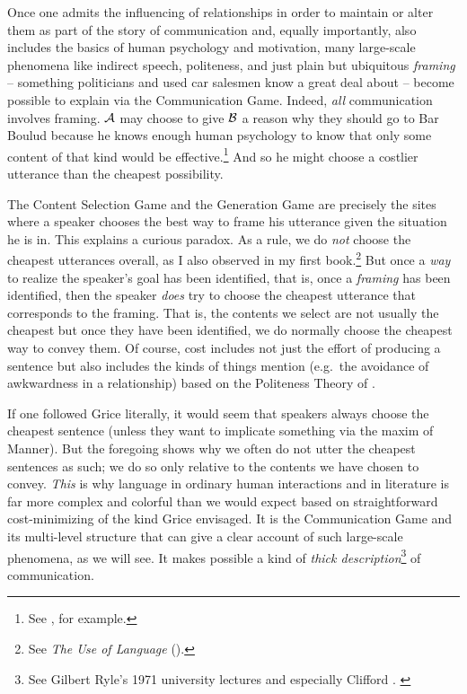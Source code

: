 Once one admits the influencing of relationships in order to maintain or alter them as part of the story of communication and, equally importantly, also includes the basics of human psychology and motivation, many large-scale phenomena like indirect speech, politeness, and just plain but ubiquitous \emph{framing} -- something politicians and used car salesmen know a great deal about -- become possible to explain via the Communication Game. Indeed, \emph{all} communication involves framing. $\cal A$ may choose to give $\cal B$ a reason why they should go to Bar Boulud because he knows enough human psychology to know that only some content of that kind would be effective.\footnote{See \citet{cialdini:i}, for example.} And so he might choose a costlier utterance than the cheapest possibility.

The Content Selection Game and the Generation Game are precisely the sites where a speaker chooses the best way to frame his utterance given the situation he is in. This explains a curious paradox. As a rule, we do \emph{not} choose the cheapest utterances overall, as I also observed in my first book.\footnote{See \emph{The Use of Language} (\citeyear[Section~8.3]{parikh:ul}).} But once a \emph{way} to realize the speaker's goal has been identified, that is, once a \emph{framing} has been identified, then the speaker \emph{does} try to choose the cheapest utterance that corresponds to the framing. That is, the contents we select are not usually the cheapest but once they have been identified, we do normally choose the cheapest way to convey them. Of course, cost includes not just the effort of producing a sentence but also includes the kinds of things \cite{pnl:lis} mention (e.g.\ the avoidance of awkwardness in a relationship) based on the Politeness Theory of \citet{bl:p}.

If one followed Grice literally, it would seem that speakers always choose the cheapest sentence (unless they want to implicate something via the maxim of Manner). But the foregoing shows why we often do not utter the cheapest sentences as such; we do so only relative to the contents we have chosen to convey. \emph{This} is why language in ordinary human interactions and in literature is far more complex and colorful than we would expect based on straightforward cost-minimizing of the kind Grice envisaged. It is the Communication Game and its multi-level structure that can give a clear account of such large-scale phenomena, as we will see. It makes possible a kind of \emph{thick description}\footnote{See Gilbert Ryle's 1971 university lectures and especially Clifford \citet{geertz:ic}. \label{foot:geertz}} of communication. 

